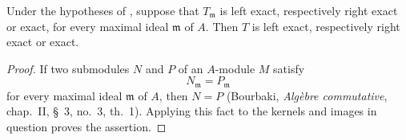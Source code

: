 \begin{proposition}[7.1.5]
\label{III.7.1.5}
Under the hypotheses of , suppose that
$T_{\mathfrak m}$ is left exact, respectively right exact or
exact, for every maximal ideal $\mathfrak m$ of $A$.  Then $T$
is left exact, respectively right exact or exact.
\end{proposition}

\begin{proof}
If two submodules $N$ and $P$ of an $A$-module $M$ satisfy
\[
  N_{\mathfrak m}=P_{\mathfrak m}
\]
for every maximal ideal $\mathfrak m$ of $A$, then $N=P$
(Bourbaki, \emph{Alg\`ebre commutative}, chap.~II, \S~3,
no.~3, th.~1).  Applying this fact to the kernels and images in
question proves the assertion.
\end{proof}






















